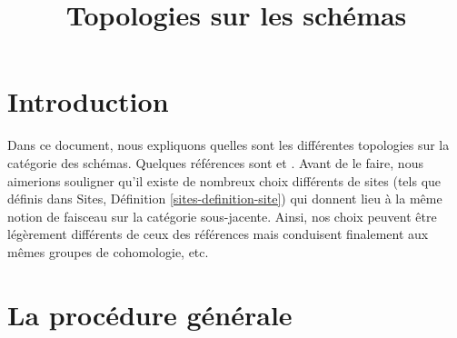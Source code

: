 

%


\title{Topologies sur les schémas}

\maketitle

\label{section-phantom}

\tableofcontents



\section{Introduction}
\label{section-introduction}

\noindent
Dans ce document, nous expliquons quelles sont les différentes topologies sur la catégorie des schémas. Quelques références sont \cite{SGA1} et \cite{Ner}. Avant de le faire, nous aimerions souligner qu'il existe de nombreux choix différents de sites (tels que définis dans Sites, Définition \ref{sites-definition-site}) qui donnent lieu à la même notion de faisceau sur la catégorie sous-jacente. Ainsi, nos choix peuvent être légèrement différents de ceux des références mais conduisent finalement aux mêmes groupes de cohomologie, etc.

\section{La procédure générale}
\label{section-procedure}

